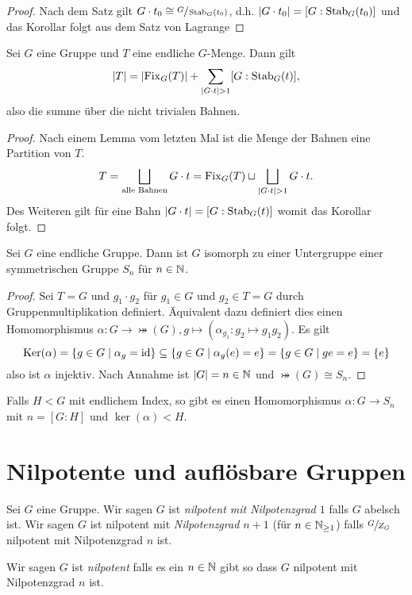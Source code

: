 \begin{proof}
	Nach dem Satz gilt $G \cdot t_0 \cong \sfrac{G}{\operatorname{Stab}_{G}(t_0)}$, d.h. $\abs{G \cdot t_0} = [G : \operatorname{Stab}_{G}(t_0)]$
	und das Korollar folgt aus dem Satz von Lagrange
\end{proof}

\begin{corollary}
	Sei $G$ eine Gruppe und $T$ eine endliche $G$-Menge. Dann gilt
	\[
		\abs{T} = \abs{\operatorname{Fix}_{G}(T)} + \sum_{\abs{G\cdot t} > 1} [G: \operatorname{Stab}_{G}(t)]
	,\] 
	also die summe über die nicht trivialen Bahnen.
\end{corollary}

\begin{proof}
	Nach einem Lemma vom letzten Mal ist die Menge der Bahnen eine Partition von $T$.
	\[
		T = \bigsqcup_{\text{alle Bahnen}} G \cdot t = \operatorname{Fix}_{G}(T) \sqcup \bigsqcup_{\abs{G \cdot t} > 1} G \cdot t 
	.\] 
	Des Weiteren gilt für eine Bahn $\abs{G \cdot t} = [G : \operatorname{Stab}_{G}(t)]$ womit das Korollar folgt.
\end{proof}

\begin{theorem}[Cayley]
	Sei $G$ eine endliche Gruppe.
	Dann ist $G$ isomorph zu einer Untergruppe einer symmetrischen Gruppe $S_{n}$ für $n \in \mathbb{N}$.
\end{theorem}

\begin{proof}
	Sei $T = G$ und $g_1 \cdot g_2$ für $g_1 \in G$ und $g_2 \in T = G$ durch Gruppenmultiplikation definiert.
	Äquivalent dazu definiert dies einen Homomorphismus $\alpha: G \to \bij(G), g \mapsto (\alpha_{g_{1}}: g_2 \mapsto  g_1g_2)$.
	Es gilt
	 \[
		 \operatorname{Ker}(\alpha) = \{g \in G \mid \alpha_{g} = \operatorname{id} \} \subseteq \{g \in G \mid \alpha_{g}(e) = e\} = \{g \in G \mid g e = e\} = \{e\} 
	\] 
	also ist $\alpha$ injektiv. Nach Annahme ist $\abs{G} = n \in \mathbb{N}$  und $\bij(G) \cong S_{n}$.
\end{proof}

\begin{remark}
	Falls $H < G$ mit endlichem Index, so gibt es einen Homomorphismus $\alpha: G \to S_{n}$ mit $n = [G:H]$ und 
	$\ker(\alpha) < H$.
\end{remark}

\section{Nilpotente und auflösbare Gruppen}

\begin{definition}
	Sei $G$ eine Gruppe. Wir sagen $G$ ist \emph{nilpotent mit Nilpotenzgrad $1$} falls $G$ abelsch ist.
	Wir sagen $G$ ist nilpotent mit \emph{Nilpotenzgrad $n+1$} (für $n \in \mathbb{N}_{\geq 1}$) falls
	$\sfrac{G}{Z_{G}}$ nilpotent mit Nilpotenzgrad $n$ ist.

	Wir sagen $G$ ist \emph{nilpotent} falls es ein $n \in \mathbb{N}$ gibt so dass $G$ nilpotent mit Nilpotenzgrad $n$ ist.
\end{definition}

